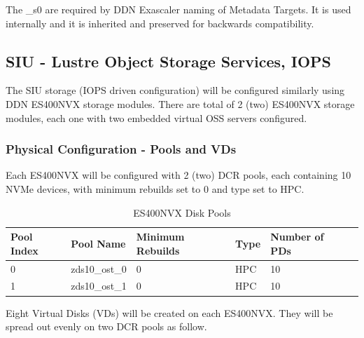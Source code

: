 \documentclass{article}
\begin{document}
The \_s0 are required by DDN Exascaler naming of Metadata Targets. It is used internally and it is inherited and preserved for backwards compatibility. 

\subsection{SIU - Lustre Object Storage Services, IOPS}
The SIU storage (IOPS driven configuration) will be configured similarly using DDN ES400NVX storage modules. There are total of 2 (two) ES400NVX storage modules, each one with two embedded virtual OSS servers configured.

\subsubsection{Physical Configuration - Pools and VDs}
Each ES400NVX will be configured with 2 (two) DCR pools, each containing 10 NVMe devices, with minimum rebuilds set to 0 and type set to HPC. 

\begin{table}[htbp]
\centering
\begin{tabular}{|l|l|l|l|l|l|}
    \hline
    \textbf{Pool Index} & \textbf{Pool Name} & \textbf{Minimum Rebuilds} & \textbf{Type} & \textbf{Number of PDs}\\
    \hline
    0 & zds10\_ost\_0 & 0 & HPC & 10 \\
    1 & zds10\_ost\_1 & 0 & HPC & 10 \\
    \hline
\end{tabular}
\caption{ES400NVX Disk Pools}
\label{tab:es400-pools-table}
\end{table}

Eight Virtual Disks (VDs) will be created on each ES400NVX. They will be spread out evenly on two DCR pools as follow.
\end{document}
